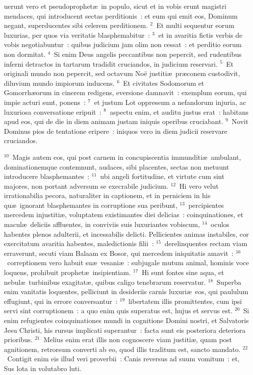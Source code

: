\bchapter
{}uerunt vero et pseudoprophet\ae\ in populo, sicut et in vobis erunt magistri mendaces, qui introducent sectas perditionis~: et eum qui emit eos, Dominum negant, superducentes sibi celerem perditionem.
${}^{2}$~Et multi sequentur eorum luxurias, per quos via veritatis blasphemabitur~:
${}^{3}$~et in avaritia fictis verbis de vobis negotiabuntur~: quibus judicium jam olim non cessat~: et perditio eorum non dormitat.
${}^{4}$~Si enim Deus angelis peccantibus non pepercit, sed rudentibus inferni detractos in tartarum tradidit cruciandos, in judicium reservari.
${}^{5}$~Et originali mundo non pepercit, sed octavum No\"e justiti\ae\ pr\ae conem custodivit, diluvium mundo impiorum inducens.
${}^{6}$~Et civitates Sodomorum et Gomorrh\ae orum in cinerem redigens, eversione damnavit~: exemplum eorum, qui impie acturi sunt, ponens~:
${}^{7}$~et justum Lot oppressum a nefandorum injuria, ac luxuriosa conversatione eripuit~:
${}^{8}$~aspectu enim, et auditu justus erat~: habitans apud eos, qui de die in diem animam justam iniquis operibus cruciabant.
${}^{9}$~Novit Dominus pios de tentatione eripere~: iniquos vero in diem judicii reservare cruciandos.


${}^{10}$~Magis autem eos, qui post carnem in concupiscentia immunditi\ae\ ambulant, dominationemque contemnunt, audaces, sibi placentes, sectas non metuunt introducere blasphemantes~:
${}^{11}$~ubi angeli fortitudine, et virtute cum sint majores, non portant adversum se execrabile judicium.
${}^{12}$~Hi vero velut irrationabilia pecora, naturaliter in captionem, et in perniciem in his qu\ae\ ignorant blasphemantes in corruptione sua peribunt,
${}^{13}$~percipientes mercedem injustiti\ae , voluptatem existimantes diei delicias~: coinquinationes, et macul\ae\ deliciis affluentes, in conviviis suis luxuriantes vobiscum,
${}^{14}$~oculos habentes plenos adulterii, et incessabilis delicti. Pellicientes animas instabiles, cor exercitatum avaritia habentes, maledictionis filii~:
${}^{15}$~derelinquentes rectam viam erraverunt, secuti viam Balaam ex Bosor, qui mercedem iniquitatis amavit~:
${}^{16}$~correptionem vero habuit su\ae\ vesani\ae~: subjugale mutum animal, hominis voce loquens, prohibuit prophet\ae\ insipientiam.
${}^{17}$~Hi sunt fontes sine aqua, et nebul\ae\ turbinibus exagitat\ae , quibus caligo tenebrarum reservatur.
${}^{18}$~Superba enim vanitatis loquentes, pelliciunt in desideriis carnis luxuri\ae\ eos, qui paululum effugiunt, qui in errore conversantur~:
${}^{19}$~libertatem illis promittentes, cum ipsi servi sint corruptionem~: a quo enim quis superatus est, hujus et servus est.
${}^{20}$~Si enim refugientes coinquinationes mundi in cognitione Domini nostri, et Salvatoris Jesu Christi, his rursus implicati superantur~: facta sunt eis posteriora deteriora prioribus.
${}^{21}$~Melius enim erat illis non cognoscere viam justiti\ae , quam post agnitionem, retrorsum converti ab eo, quod illis traditum est, sancto mandato.
${}^{22}$~Contigit enim eis illud veri proverbii~: Canis reversus ad suum vomitum~: et, Sus lota in volutabro luti.

